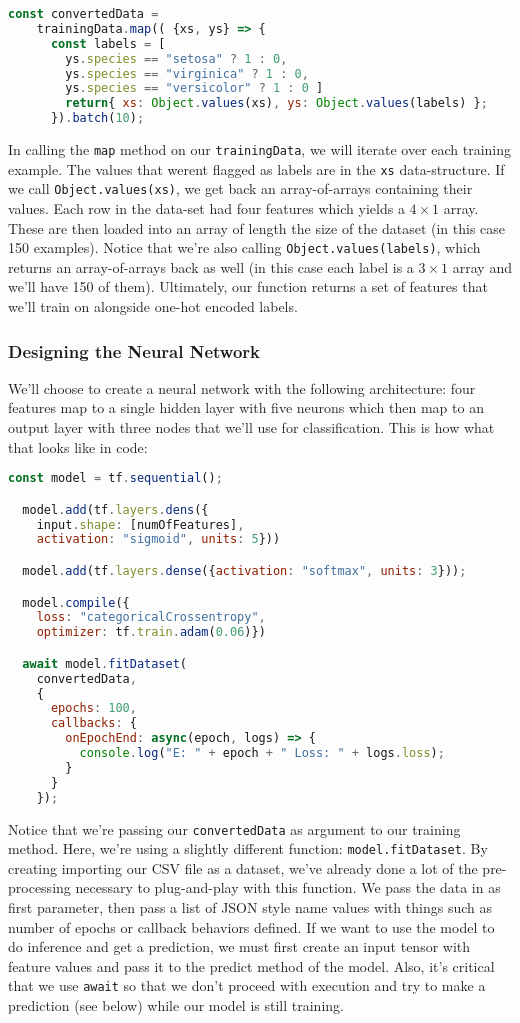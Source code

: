 \documentclass[12pt]{article}
\begin{document}
\begin{lstlisting}[language=JavaScript]
  const convertedData =
    trainingData.map(( {xs, ys} => {
      const labels = [
        ys.species == "setosa" ? 1 : 0,
        ys.species == "virginica" ? 1 : 0,
        ys.species == "versicolor" ? 1 : 0 ]
        return{ xs: Object.values(xs), ys: Object.values(labels) };
      }).batch(10);
\end{lstlisting}
In calling the \texttt{map} method on our \texttt{trainingData}, we will iterate over each training example. The values that werent flagged as labels are in the \texttt{xs} data-structure. If we call \texttt{Object.values(xs)}, we get back an array-of-arrays containing their values. Each row in the data-set had four features which yields a $4 \times 1$ array. These are then loaded into an array of length the size of the dataset (in this case 150 examples). Notice that we're also calling \texttt{Object.values(labels)}, which returns an array-of-arrays back as well (in this case each label is a $3 \times 1$ array and we'll have 150 of them). Ultimately, our function returns a set of features that we'll train on alongside one-hot encoded labels.

\subsubsection{Designing the Neural Network} We'll choose to create a neural network with the following architecture: four features map to a single hidden layer with five neurons which then map to an output layer with three nodes that we'll use for classification. This is how what that looks like in code:
\begin{lstlisting}[language=JavaScript]
  const model = tf.sequential();

  model.add(tf.layers.dens({
    input.shape: [numOfFeatures],
    activation: "sigmoid", units: 5}))

  model.add(tf.layers.dense({activation: "softmax", units: 3}));

  model.compile({
    loss: "categoricalCrossentropy",
    optimizer: tf.train.adam(0.06)})

  await model.fitDataset(
    convertedData,
    {
      epochs: 100,
      callbacks: {
        onEpochEnd: async(epoch, logs) => {
          console.log("E: " + epoch + " Loss: " + logs.loss);
        }
      }
    });
\end{lstlisting}

Notice that we're passing our \texttt{convertedData} as argument to our training method. Here, we're using a slightly different function: \texttt{model.fitDataset}. By creating importing our CSV file as a dataset, we've already done a lot of the pre-processing necessary to plug-and-play with this function. We pass the data in as first parameter, then pass a list of JSON style name values with things such as number of epochs or callback behaviors defined. If we want to use the model to do inference and get a prediction, we must first create an input tensor with feature values and pass it to the predict method of the model. Also, it's critical that we use \texttt{await} so that we don't proceed with execution and try to make a prediction (see below) while our model is still training.
\end{document}
